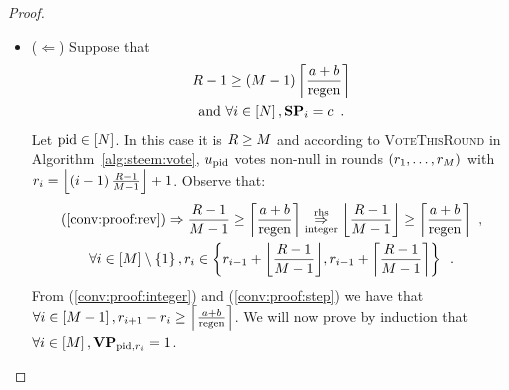 \begin{proof}
  \begin{itemize}
    \item ($\Leftarrow$) Suppose that
    \begin{gather}
      \label{conv:proof:rev}
      \rounds - 1 \geq \left(\postlen - 1\right)\ceil*{\frac{a+b}{\regen}} \\
      \text{and } \forall i \in \left[\playerlen\right], \stpowvec_i = c
      \enspace. \nonumber
    \end{gather}
    Let $\pid \in \left[\playerlen\right]$. In this case it is $\rounds \geq
    \postlen$ and according to \textsc{VoteThisRound} in
    Algorithm~\ref{alg:steem:vote}, $u_{\pid}$ votes non-null in rounds
    $\left(\round_1, \dots, \round_\postlen\right)$ with $r_i = \floor*{\left(i
    - 1\right)\frac{\rounds - 1}{\postlen - 1}} + 1$. Observe that:
    \begin{gather}
      \label{conv:proof:integer}
      \left(\ref{conv:proof:rev}\right) \Rightarrow \frac{\rounds - 1}{\postlen
      - 1} \geq \ceil*{\frac{a+b}{\regen}}
      \underset{\text{integer}}{\overset{\text{rhs}}{\Rightarrow}}
      \floor*{\frac{\rounds - 1}{\postlen - 1}} \geq \ceil*{\frac{a+b}{\regen}}
      \enspace, \\
      \label{conv:proof:step}
      \forall i \in \left[\postlen\right] \setminus \left\{1\right\}, r_i
      \in \left\{r_{i - 1} + \floor*{\frac{\rounds - 1}{\postlen - 1}}, r_{i -
      1} + \ceil*{\frac{\rounds - 1}{\postlen - 1}}\right\} \enspace.
    \end{gather}
    From (\ref{conv:proof:integer}) and (\ref{conv:proof:step}) we have that
    $\forall i \in \left[\postlen - 1\right], r_{i+1} - r_i \geq
    \ceil*{\frac{a+b}{\regen}}$. We will now prove by induction that $\forall i
    \in \left[\postlen\right], \votpowvec_{\pid, r_i} = 1$.


\end{itemize}
\end{proof}
